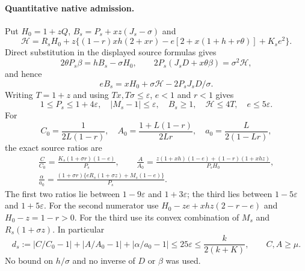 \documentclass[11pt]{article}
\begin{document}
\paragraph{Quantitative native admission.}
Put $H_0=1+zQ$, $B_s=P_s+xz(J_s-\sigma)$ and
\[
 \mathcal H=R_sH_0+z\{(1-r)xh(2+xr)
                      -e[2+x(1+h+r\theta)]+K_se^2\}.
\]
Direct substitution in the displayed source formulas gives
\[
 2\theta P_s\beta=hB_s-\sigma H_0,\qquad
 2P_s(J_sD+x\theta\beta)=\sigma^2\mathcal H,
\]
and hence
\[
 eB_s=xH_0+\sigma\mathcal H-2P_sJ_sD/\sigma.
\]
Writing $T=1+z$ and using $Tx,T\sigma\le\varepsilon$,
$e<1$ and $r<1$ gives
\[
 1\le P_s\le1+4\varepsilon,\quad |M_s-1|\le\varepsilon,
 \quad B_s\ge1,\quad\mathcal H\le4T,
 \quad e\le5\varepsilon.
\]
For
\[
 C_0=\frac1{2L(1-r)},\quad
 A_0=\frac{1+L(1-r)}{2Lr},\quad
 a_0=\frac L{2(1-Lr)},
\]
the exact source ratios are
\begin{gather*}
 \frac C{C_0}=\frac{K_s(1+\sigma r)(1-e)}{P_s},\qquad
 \frac A{A_0}=\frac{z(1+xh)(1-e)+(1-r)(1+xhz)}{P_sH_0},\\
 \frac\alpha{a_0}=
 \frac{(1+\sigma r)\{eR_s(1+\sigma z)+M_s(1-e)\}}{P_s}.
\end{gather*}
The first two ratios lie between $1-9\varepsilon$ and
$1+3\varepsilon$; the third lies between $1-5\varepsilon$
and $1+5\varepsilon$. For the second numerator use
$H_0-ze+xhz(2-r-e)$ and $H_0-z=1-r>0$.
For the third use its convex combination of $M_s$ and
$R_s(1+\sigma z)$. In particular
\begin{equation}\label{eq:source-admit}
 d_s:=|C/C_0-1|+|A/A_0-1|+|\alpha/a_0-1|
 \le25\varepsilon\le\frac{k}{2(k+K)},\qquad C,A\ge\mu.
\end{equation}
No bound on $h/\sigma$ and no inverse of $D$ or $\beta$ was used.
\end{document}
